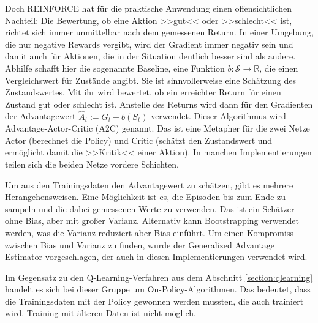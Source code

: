 Doch REINFORCE hat für die praktische Anwendung einen offensichtlichen Nachteil: Die Bewertung, ob eine Aktion >>gut<< oder >>schlecht<< ist, richtet sich immer unmittelbar nach dem gemessenen Return.
In einer Umgebung, die nur negative Rewards vergibt, wird der Gradient immer negativ sein und damit auch für Aktionen, die in der Situation deutlich besser sind als andere.
Abhilfe schafft hier die sogenannte Baseline, eine Funktion $b: \mathcal{S} \rightarrow \mathbb{R}$, die einen Vergleichswert für Zustände angibt.
Sie ist sinnvollerweise eine Schätzung des Zustandswertes.
Mit ihr wird bewertet, ob ein erreichter Return für einen Zustand gut oder schlecht ist.
Anstelle des Returns wird dann für den Gradienten der Advantagewert $\hat{A}_t := G_t - b(S_t)$ verwendet.
Dieser Algorithmus wird Advantage-Actor-Critic (A2C) genannt.
Das ist eine Metapher für die zwei Netze Actor (berechnet die Policy) und Critic (schätzt den Zustandswert und ermöglicht damit die >>Kritik<< einer Aktion).
In manchen Implementierungen teilen sich die beiden Netze vordere Schichten.

Um aus den Trainingsdaten den Advantagewert zu schätzen, gibt es mehrere Herangehensweisen.
Eine Möglichkeit ist es, die Episoden bis zum Ende zu sampeln und die dabei gemessenen Werte zu verwenden.
Das ist ein Schätzer ohne Bias, aber mit großer Varianz.
Alternativ kann Bootstrapping verwendet werden, was die Varianz reduziert aber Bias einführt.
Um einen Kompromiss zwischen Bias und Varianz zu finden, wurde der Generalized Advantage Estimator \cite{https://doi.org/10.48550/arxiv.1506.02438} vorgeschlagen, der auch in diesen Implementierungen verwendet wird.

Im Gegensatz zu den Q-Learning-Verfahren aus dem Abschnitt \ref{section:qlearning} handelt es sich bei dieser Gruppe um On-Policy-Algorithmen.
Das bedeutet, dass die Trainingsdaten mit der Policy gewonnen werden mussten, die auch trainiert wird.
Training mit älteren Daten ist nicht möglich.

